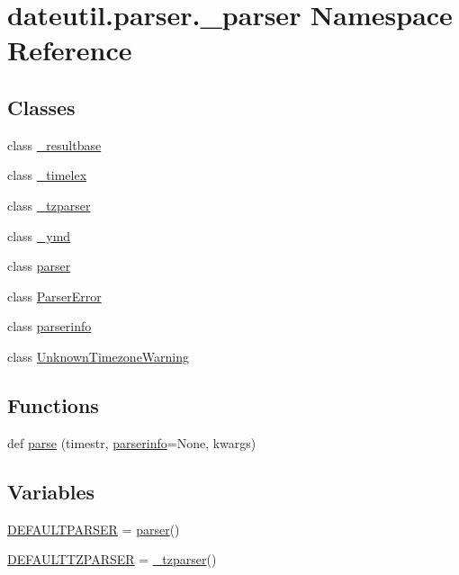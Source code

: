 \hypertarget{namespacedateutil_1_1parser_1_1__parser}{}\section{dateutil.\+parser.\+\_\+parser Namespace Reference}
\label{namespacedateutil_1_1parser_1_1__parser}
\subsection*{Classes}
\begin{DoxyCompactItemize}
\item 
class \hyperlink{classdateutil_1_1parser_1_1__parser_1_1__resultbase}{\+\_\+resultbase}
\item 
class \hyperlink{classdateutil_1_1parser_1_1__parser_1_1__timelex}{\+\_\+timelex}
\item 
class \hyperlink{classdateutil_1_1parser_1_1__parser_1_1__tzparser}{\+\_\+tzparser}
\item 
class \hyperlink{classdateutil_1_1parser_1_1__parser_1_1__ymd}{\+\_\+ymd}
\item 
class \hyperlink{classdateutil_1_1parser_1_1__parser_1_1parser}{parser}
\item 
class \hyperlink{classdateutil_1_1parser_1_1__parser_1_1ParserError}{Parser\+Error}
\item 
class \hyperlink{classdateutil_1_1parser_1_1__parser_1_1parserinfo}{parserinfo}
\item 
class \hyperlink{classdateutil_1_1parser_1_1__parser_1_1UnknownTimezoneWarning}{Unknown\+Timezone\+Warning}
\end{DoxyCompactItemize}
\subsection*{Functions}
\begin{DoxyCompactItemize}
\item 
def \hyperlink{namespacedateutil_1_1parser_1_1__parser_aa5fbf50041e5bc1cee98263750783f7c}{parse} (timestr, \hyperlink{classdateutil_1_1parser_1_1__parser_1_1parserinfo}{parserinfo}=None, kwargs)
\end{DoxyCompactItemize}
\subsection*{Variables}
\begin{DoxyCompactItemize}
\item 
\hyperlink{namespacedateutil_1_1parser_1_1__parser_a8e75ff5e3f1593dc66f300731a663464}{D\+E\+F\+A\+U\+L\+T\+P\+A\+R\+S\+ER} = \hyperlink{classdateutil_1_1parser_1_1__parser_1_1parser}{parser}()
\item 
\hyperlink{namespacedateutil_1_1parser_1_1__parser_ac93cf0effa79f2c46ff007c2b4b105e9}{D\+E\+F\+A\+U\+L\+T\+T\+Z\+P\+A\+R\+S\+ER} = \hyperlink{classdateutil_1_1parser_1_1__parser_1_1__tzparser}{\+\_\+tzparser}()
\end{DoxyCompactItemize}


